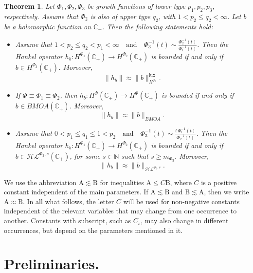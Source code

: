 \documentclass[a4paper,12pt,intlimits,oneside]{amsart}
\newtheorem{theorem}{Theorem}[section]
\theoremstyle{definition}
\numberwithin{equation}{section}
\theoremstyle{definition}
\begin{document}
\begin{theorem}\label{pro:mainfqmaqppaaqq5}
Let $\Phi_{1}, \Phi_{2}, \Phi_{3}$ be growth functions of lower type $p_{1}, p_{2}, p_{3}$, respectively. Assume that $\Phi_{2}$ is also of upper type $q_{2}$, with
$1 < p_{2} \leq q_{2} < \infty$. Let $b$ be a holomorphic function on $\mathbb{C}_{+}$. Then the following statements hold:
\begin{itemize}
\item[(i)] Assume that
$1 < p_{2} \leq q_{2} < p_{1} < \infty
\quad \text{and} \quad
\Phi_{3}^{-1}(t) \sim \frac{\Phi_{2}^{-1}(t)}{\Phi_{1}^{-1}(t)}$. Then the Hankel operator $h_{b} : H^{\Phi_{1}}(\mathbb{C}_{+}) \to H^{\Phi_{2}}(\mathbb{C}_{+})$ is bounded if and only if $b \in H^{\Phi_{3}}(\mathbb{C}_{+})$. Moreover,
\[
\|h_{b}\| \approx \|b\|_{H^{\Phi_{3}}}^{\mathrm{lux}}.
\]
\item[(ii)] If $\Phi\equiv\Phi_{1} \equiv \Phi_{2}$, then
$h_{b} : H^{\Phi}(\mathbb{C}_{+}) \to H^{\Phi}(\mathbb{C}_{+})$
is bounded if and only if $b \in BMOA(\mathbb{C}_{+})$. Moreover,
\[
\|h_{b}\| \approx \|b\|_{BMOA}.
\]

\item[(iii)] Assume that $0 < p_{1} \leq q_{1} \leq 1 < p_{2}
\quad \text{and} \quad
\Phi_{3}^{-1}(t) \sim \frac{t\,\Phi_{1}^{-1}(t)}{\Phi_{2}^{-1}(t)}$. Then the Hankel operator $h_{b} : H^{\Phi_{1}}(\mathbb{C}_{+}) \to H^{\Phi_{2}}(\mathbb{C}_{+})$ is bounded if and only if $b \in \mathcal{H}\mathcal{L}^{\Phi_{3},s}(\mathbb{C}_{+})$, for some $s \in \mathbb{N}$ such that $s \geq m_{\Phi_{3}}$. Moreover,
\[
\|h_{b}\| \approx \|b\|_{\mathcal{H}\mathcal{L}^{\Phi_{3},s}}.
\]
\end{itemize}
\end{theorem}


We use the  abbreviation $\mathrm{ A}\lesssim \mathrm{ B}$ for inequalities $\mathrm{ A}\leq C\mathrm{ B}$, where $C$ is a positive constant independent of the main parameters. If $\mathrm{ A}\lesssim \mathrm{ B}$ and $\mathrm{ B}\lesssim \mathrm{ A}$, then we write $\mathrm{ A} \approx \mathrm{ B}$.
In all what follows, the letter $C$ will be used for non-negative constants independent of the relevant variables that may change from one occurrence to another. Constants with subscript, such as $C_{s}$, may also change in different occurrences, but depend on the parameters mentioned in it. 



\section{Preliminaries.}
\end{document}
